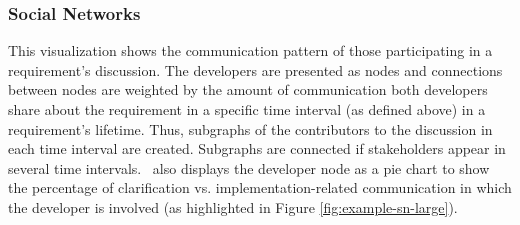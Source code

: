 \subsubsection{Social Networks} 
This visualization shows the communication pattern of those participating in a requirement's discussion. 
The developers are presented as nodes and connections between nodes are weighted by the amount of communication both developers share about the requirement in a specific time interval (as defined above) in a requirement's lifetime. 
Thus, subgraphs of the contributors to the discussion in each time interval are created.
Subgraphs are connected if  stakeholders appear in several time intervals. 
\viss\ also displays the developer node as a pie chart to show the percentage of clarification vs. implementation-related communication in which the developer is involved (as highlighted in Figure \ref{fig:example-sn-large}).





